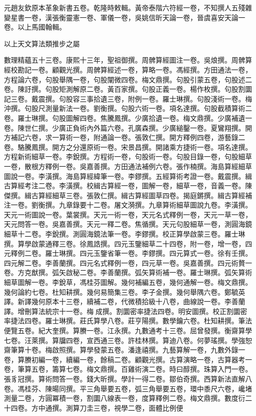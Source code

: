 \begin{pinyinscope}
元趙友欽原本革象新書五卷。乾隆時敕輯。黃帝泰階六符經一卷，不知撰人五殘雜變星書一卷，漢張衡靈憲一卷、軍儀一卷，吳姚信昕天論一卷，晉虞喜安天論一卷。以上馬國翰輯。

以上天文算法類推步之屬

數理精蘊五十三卷。康熙十三年，聖祖御撰。周髀算經圖注一卷。吳烺撰。周髀算經校勘記一卷。顧觀光撰。周髀算經述一卷，算略一卷。馮經撰。方田通法一卷，方程論六卷，句股舉隅一卷，句股闡微四卷。梅文鼎撰。句股引蒙五卷，句股述二卷。陳訏撰。句股矩測解原二卷。黃百家撰。句股正義一卷。楊作枚撰。句股割圜記三卷。戴震撰。句股容三事拾遺三卷，附例一卷。羅士琳撰。句股淺術一卷。梅沖撰。句股尺測量新法一卷。劉衡撰。句股六術一卷。項名達撰。句股截積算術二卷。羅士琳撰。句股圖解四卷。焦騰鳳撰。少廣拾遺一卷。梅文鼎撰。少廣補遺一卷。陳世仁撰。少廣正負術內外篇六卷。孔廣森撰。少廣縋鑿一卷。夏鸞翔撰。開方補記六卷，求一算術一卷，附通論一卷。張敦仁撰。開方釋例四卷，游藝錄二卷。駱騰鳳撰。開方之分還原術一卷。宋景昌撰。開諸乘方捷術一卷。項名達撰。方程新術細草一卷。李銳撰。方程術一卷，句股術一卷。句股目錄一卷，句股細草一卷，散根方釋例一卷。吳嘉善撰。方田通法補例六卷。張作楠撰。海島算經細草圖說一卷。李潢撰。海島算經緯筆一卷。李鏐撰。五經算術考證一卷。戴震撰。緝古算經考注二卷。李潢撰。校緝古算經一卷，圖解一卷，細草一卷，音義一卷。陳傑撰。緝古算經細草三卷。張敦仁撰。緝古算經圖草四卷。揭庭鏘撰。緝古算經補注一卷。劉衡撰。九章錄要十二卷。屠文漪撰。九章算術細草圖說九卷。李潢撰。天元一術圖說一卷。葉裳撰。天元一術一卷，天元名式釋例一卷，天元一草一卷，天元問答一卷。吳嘉善撰。天元一釋二卷。焦循撰。天元句股細草一卷，測圓海鏡細草十二卷。李銳撰。測圓海鏡法筆一卷。李鏐撰。校正算學啟蒙三卷。羅士琳撰。算學啟蒙通釋三卷。徐鳳誥撰。四元玉鑒細草二十四卷，附一卷，增一卷，四元釋例二卷。羅士琳撰。四元玉鑒省筆一卷。李鏐撰。四元算式一卷。徐有壬撰。四元解二卷。李善蘭撰。四元名式釋例一卷，四元草一卷。吳嘉善撰。四元術贅一卷。方克猷撰。弧矢啟秘二卷。李善蘭撰。弧矢算術補一卷。羅士琳撰。弧矢算術細草圖解一卷。李銳草，馮桂芬圖解。幾何補編五卷，幾何通解一卷。梅文鼎撰。幾何論約七卷。杜知耕撰。幾何易簡集三卷。李子金撰。幾何舉隅六卷。鄭毓英譯。新譯幾何原本十三卷，續補二卷，代微積拾級十八卷，曲線說一卷。李善蘭譯。增刪算法統宗十一卷。梅成撰。割圜密率捷法四卷。明安圖撰。校正割圜密率捷法四卷。羅士琳撰。莊氏算學八卷。莊亨陽撰。數學鑰六卷。杜知耕撰。筆法便覽五卷。紀大奎撰。算賸一卷。江永撰。九數通考十三卷。屈曾發撰。衡齋算學七卷。汪萊撰。算牖四卷，宣西通三卷。許桂林撰。算迪八卷。何夢瑤撰。學強恕齋筆算十卷。梅啟照撰。算學發蒙五卷。潘逢禧撰。九藝算解一卷，九數外錄一卷，算賸初編一卷，續編一卷，餘稿二卷。顧觀光撰。古算演略一卷，古算器考一卷，筆算五卷，籌算七卷。梅文鼎撰。百雞術演二卷。時曰醇撰。珠算入門一卷。張豸冠撰。算術問答一卷。錢大昕撰。學計一得二卷。鄒伯奇撰。西算新法直解八卷。馮桂芬、陳暘同撰。平三角舉要五卷，弧三角舉要五卷，環中黍尺六卷，巉堵測量二卷，方圓冪積一卷，割圜八線表一卷，度算釋例二卷。梅文鼎撰。數度衍二十四卷。方中通撰。測算刀圭三卷，視學二卷，面體比例便
\end{pinyinscope}
